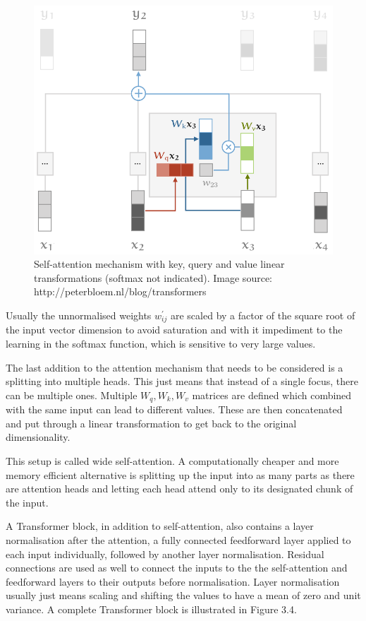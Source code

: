 \documentclass[bsc,frontabs,singlespacing,parskip,deptreport]{infthesis}
\begin{document}
\begin{figure}
\centering
\includegraphics[width = 5in]{key-query-value}
\setlength{\belowcaptionskip}{0pt}
\caption{Self-attention mechanism with key, query and value linear transformations (softmax not indicated). Image source: http://peterbloem.nl/blog/transformers}
\label{gru}
\vskip -5mm
\end{figure}

Usually the unnormalised weights $ w_{ij}^\prime $ are scaled by a factor of the square root of the input vector dimension to avoid saturation and with it impediment to the learning in the softmax function, which is sensitive to very large values.

The last addition to the attention mechanism that needs to be considered is a splitting into multiple heads. This just means that instead of a single focus, there can be multiple ones. Multiple $ W_q, W_k, W_v $ matrices are defined which combined with the same input can lead to different values. These are then concatenated and put through a linear transformation to get back to the original dimensionality.

This setup is called wide self-attention. A computationally cheaper and more memory efficient alternative is splitting up the input into as many parts as there are attention heads and letting each head attend only to its designated chunk of the input.

A Transformer block, in addition to self-attention, also contains a layer normalisation after the attention, a fully connected feedforward layer applied to each input individually, followed by another layer normalisation. Residual connections are used as well to connect the inputs to the the self-attention and feedforward layers to their outputs before normalisation. Layer normalisation usually just means scaling and shifting the values to have a mean of zero and unit variance. A complete Transformer block is illustrated in Figure 3.4. 
\end{document}
